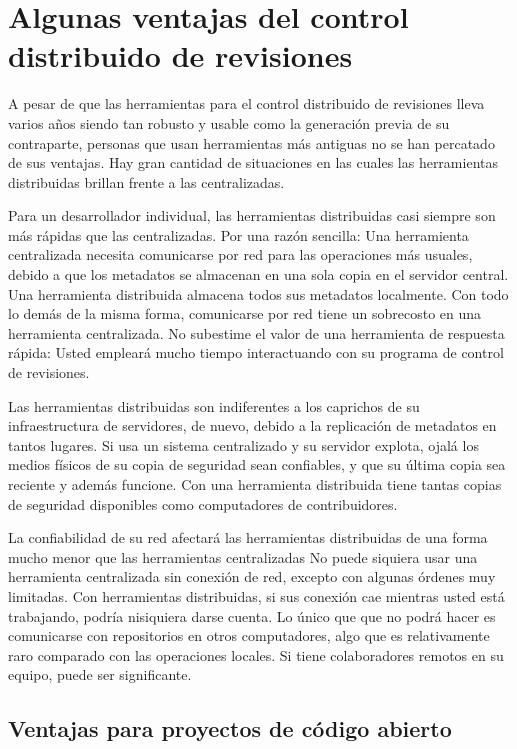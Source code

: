 \section{Algunas ventajas del control distribuido de revisiones}

A pesar de que las herramientas para el control distribuido de
revisiones lleva varios años siendo tan robusto y usable como la
generación previa de su contraparte, personas que usan herramientas
más antiguas no se han percatado de sus ventajas.  Hay gran cantidad
de situaciones en las cuales las herramientas distribuidas brillan
frente a las centralizadas.

Para un desarrollador individual, las herramientas distribuidas casi
siempre son más rápidas que las centralizadas. Por una razón sencilla:
Una herramienta centralizada necesita comunicarse por red para las
operaciones más usuales, debido a que los metadatos se almacenan en
una sola copia en el servidor central. Una herramienta distribuida
almacena todos sus metadatos localmente.  Con todo lo demás de la
misma forma, comunicarse por red tiene un sobrecosto en una
herramienta centralizada. No subestime el valor de una herramienta de
respuesta rápida: Usted empleará mucho tiempo interactuando con su
programa de control de revisiones.

Las herramientas distribuidas son indiferentes a los caprichos de su
infraestructura de servidores, de nuevo, debido a la replicación de
metadatos en tantos lugares. Si usa un sistema centralizado y su
servidor explota, ojalá los medios físicos de su copia de seguridad
sean confiables, y que su última copia sea reciente y además
funcione. Con una herramienta distribuida tiene tantas copias de
seguridad disponibles como computadores de contribuidores.

La confiabilidad de su red afectará las herramientas distribuidas de
una forma mucho menor que las herramientas centralizadas No puede
siquiera usar una herramienta centralizada sin conexión de red,
excepto con algunas órdenes muy limitadas. Con herramientas
distribuidas, si sus conexión cae mientras usted está trabajando,
podría nisiquiera darse cuenta. Lo único que que no podrá hacer es
comunicarse  con repositorios en otros computadores, algo que es
relativamente raro comparado con las operaciones locales. Si tiene
colaboradores remotos en su equipo, puede ser significante.

\subsection{Ventajas para proyectos de código abierto}

